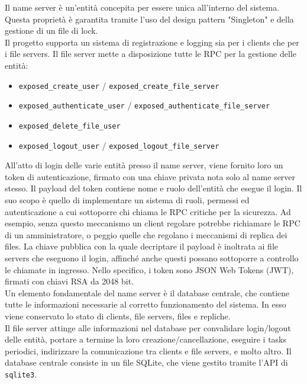 \documentclass[a4paper, 12pt]{scrreprt}
\begin{document}

            Il name server è un'entità concepita per essere unica all'interno del sistema. Questa proprietà è garantita tramite l'uso del design pattern "Singleton" e della gestione di un file di lock.\\
            Il progetto supporta un sistema di registrazione e logging sia per i clients che per i file servers. Il file server mette a disposizione tutte le RPC per la gestione delle entità:

            \begin{itemize}

                \item \texttt{exposed\_create\_user} / \texttt{exposed\_create\_file\_server}

                \item \texttt{exposed\_authenticate\_user} / \texttt{exposed\_authenticate\_file\_server}

                \item \texttt{exposed\_delete\_file\_user}

                \item \texttt{exposed\_logout\_user} / \texttt{exposed\_logout\_file\_server}

            \end{itemize}

            All'atto di login delle varie entità presso il name server, viene fornito loro un token di autenticazione, firmato con una chiave privata nota solo al name server stesso. Il payload del token contiene nome e ruolo dell'entità che esegue il login. Il suo scopo è quello di implementare un sistema di ruoli, permessi ed autenticazione a cui sottoporre chi chiama le RPC critiche per la sicurezza. Ad esempio, senza questo meccanismo un client regolare potrebbe richiamare le RPC di un amministratore, o peggio quelle che regolano i meccanismi di replica dei files. La chiave pubblica con la quale decriptare il payload è inoltrata ai file servers che eseguono il login, affinché anche questi possano sottoporre a controllo le chiamate in ingresso. Nello specifico, i token sono JSON Web Tokens (JWT), firmati con chiavi RSA da 2048 bit.\\
            Un elemento fondamentale del name server è il database centrale, che contiene tutte le informazioni necessarie al corretto funzionamento del sistema. In esso viene conservato lo stato di clients, file servers, files e repliche.\\
            Il file server attinge alle informazioni nel database per convalidare login/logout delle entità, portare a termine la loro creazione/cancellazione, eseguire i tasks periodici, indirizzare la comunicazione tra clients e file servers, e molto altro. Il database centrale consiste in un file SQLite, che viene gestito tramite l'API di \texttt{sqlite3}.
\end{document}
